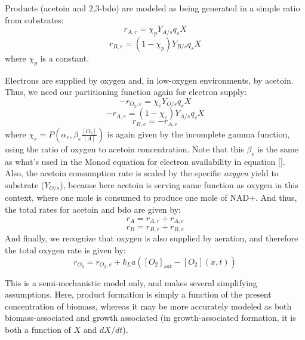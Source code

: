 \documentclass[11pt]{article} %
\begin{document}
Products (acetoin and 2,3-bdo) are modeled as being generated in a simple ratio from substrates:
\begin{equation}
	r_{A, r} = \chi_p Y_{A/s} q_s X
\end{equation}
\begin{equation}
	r_{B, r} = (1-\chi_p) Y_{B/s} q_s X
\end{equation}
where $\chi_p$ is a constant.

Electrons are supplied by oxygen and, in low-oxygen environments, by acetoin. Thus, we need our partitioning function again for electron supply:
\begin{equation}
	-r_{O_2,e} = \chi_e Y_{O/s} q_s X
\end{equation}
\begin{equation}
	-r_{A, e} = (1-\chi_e) Y_{A/s} q_s X
\end{equation}
\begin{equation}
	r_{B,e} = - r_{A,e}
\end{equation}
where $\chi_e = P(\alpha_e, \beta_e \frac{[O_2]}{[A]})$ is again given by the incomplete gamma function, using the ratio of oxygen to acetoin concentration. Note that this $\beta_e$ is the same as what's used in the Monod equation for electron availability in equation \ref{}. Also, the acetoin consumption rate is scaled by the specific \emph{oxygen} yield to substrate ($Y_{O/s}$), because here acetoin is serving same function as oxygen in this context, where one mole is consumed to produce one mole of NAD+. 
And thus, the total rates for acetoin and bdo are given by:
\begin{equation}
	r_{A} = r_{A,r} + r_{A,e}
\end{equation}
\begin{equation}
	r_{B} = r_{B,r} + r_{B,e}
\end{equation}
And finally, we recognize that oxygen is also supplied by aeration, and therefore the total oxygen rate is given by:
\begin{equation}
	r_{O_2} = r_{O_2,e} + k_L a ([O_2]_{sat} - [O_2](x,t))
\end{equation}

This is a semi-mechanistic model only, and makes several simplifying assumptions. Here, product formation is simply a function of the present concentration of biomass, whereas it may be more accurately modeled as both biomass-associated and growth associated (in growth-associated formation, it is both a function of $X$ and $dX/dt$). 
\end{document}
